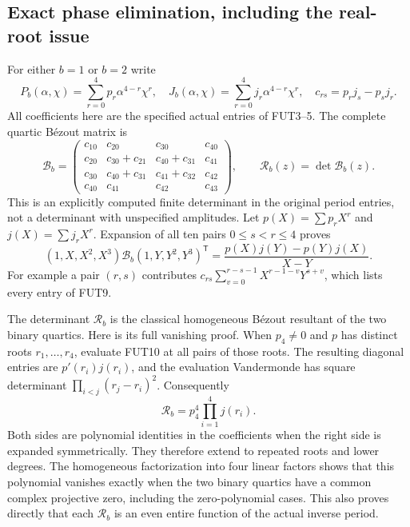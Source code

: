 \documentclass[11pt]{article}
\begin{document}
\subsection{Exact phase elimination, including the real-root issue}
For either $b=1$ or $b=2$ write
\[
 P_b(\alpha,\chi)=\sum_{r=0}^4p_r\alpha^{4-r}\chi^r,
 \quad J_b(\alpha,\chi)=\sum_{r=0}^4j_r\alpha^{4-r}\chi^r,
 \quad c_{rs}=p_rj_s-p_sj_r.
 \tag{FUT8}
\]
All coefficients here are the specified actual entries of FUT3--5.
The complete quartic B\'ezout matrix is
\[
 \mathcal B_b=
 \begin{pmatrix}
 c_{10}&c_{20}&c_{30}&c_{40}\\
 c_{20}&c_{30}+c_{21}&c_{40}+c_{31}&c_{41}\\
 c_{30}&c_{40}+c_{31}&c_{41}+c_{32}&c_{42}\\
 c_{40}&c_{41}&c_{42}&c_{43}
 \end{pmatrix},\qquad
 \mathscr R_b(z)=\det\mathcal B_b(z).
 \tag{FUT9}
\]
This is an explicitly computed finite determinant in the original
period entries, not a determinant with unspecified amplitudes.
Let $p(X)=\sum p_rX^r$ and $j(X)=\sum j_rX^r$.
Expansion of all ten pairs $0\le s<r\le4$ proves
\[
 (1,X,X^2,X^3)\mathcal B_b(1,Y,Y^2,Y^3)^{\mathsf T}
       =\frac{p(X)j(Y)-p(Y)j(X)}{X-Y}.
 \tag{FUT10}
\]
For example a pair $(r,s)$ contributes
$c_{rs}\sum_{v=0}^{r-s-1}X^{r-1-v}Y^{s+v}$,
which lists every entry of FUT9.

The determinant $\mathscr R_b$ is the classical homogeneous B\'ezout
resultant of the two binary quartics. Here is its full vanishing proof.
When $p_4\ne0$ and $p$ has distinct roots $r_1,\ldots,r_4$,
evaluate FUT10 at all pairs of those roots. The resulting diagonal
entries are $p'(r_i)j(r_i)$, and the evaluation Vandermonde has
square determinant $\prod_{i<j}(r_j-r_i)^2$. Consequently
\[
 \mathscr R_b=p_4^4\prod_{i=1}^4j(r_i).
 \tag{FUT11}
\]
Both sides are polynomial identities in the coefficients when the
right side is expanded symmetrically. They therefore extend to repeated
roots and lower degrees. The homogeneous factorization into four
linear factors shows that this polynomial vanishes exactly when the
two binary quartics have a common complex projective zero, including
the zero-polynomial cases. This also proves directly that each
$\mathscr R_b$ is an even entire function of the actual inverse period.
\end{document}
